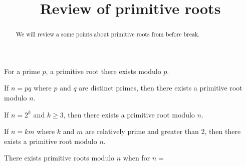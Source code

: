 \documentclass{ximera}
\title{Review of primitive roots}
\begin{document}
  
\begin{abstract}  
We will review a some points about primitive roots from before break.
\end{abstract}  
\maketitle  

\begin{question}
For a prime $p$, a primitive root there exists modulo $p$.
\begin{multipleChoice}
\end{multipleChoice}
\end{question}

\begin{question}
 If $n=pq$ where $p$ and $q$ are distinct primes, then there exists a primitive root modulo $n$.
 \begin{multipleChoice}
\end{multipleChoice}
\end{question}

\begin{question}
 If $n=2^k$ and $k\geq 3$, then there exists a primitive root modulo $n$.
 \begin{multipleChoice}
\end{multipleChoice}
\end{question}

\begin{question}
 If $n=km$ where $k$ and $m$ are relatively prime and greater than 2, then there exists a primitive root modulo $n$.
 \begin{multipleChoice}
\end{multipleChoice}
\end{question}

\begin{question}
There exists primitive roots modulo $n$ when for $n=$
 \begin{selectAll}
\end{selectAll}
\end{question}
\end{document}
